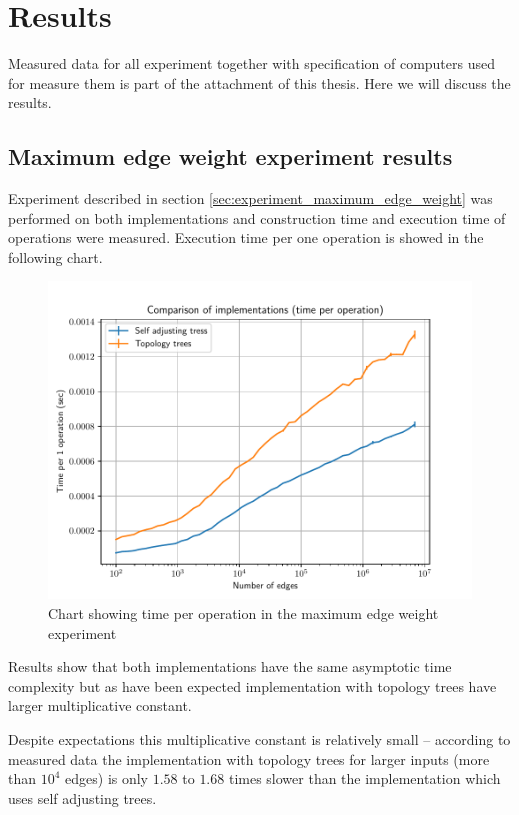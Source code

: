 \chapter{Results}
\label{chap:Results}

Measured data for all experiment together with specification of computers used
for measure them is part of the attachment of this thesis. Here we will discuss
the results.

\section{Maximum edge weight experiment results}
\label{sec:results_maximum_edge_weight}

Experiment described in section \ref{sec:experiment_maximum_edge_weight} was
performed on both implementations and construction time and execution time of
operations were measured. Execution time per one operation is showed in the
following chart.

\begin{figure}[H]
\centering
{}\hsize
\includegraphics[width=\hsize]{charts/maximum_edge_weight_op.pdf}
\caption{Chart showing time per operation in the maximum edge weight experiment}
\end{figure}

Results show that both implementations have the same asymptotic time complexity
but as have been expected implementation with topology trees have larger
multiplicative constant.

Despite expectations this multiplicative constant is relatively small --
according to measured data the implementation with topology trees for larger
inputs (more than $10^4$ edges) is only $1.58$ to $1.68$ times slower than the
implementation which uses self adjusting trees.

